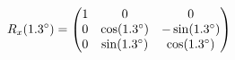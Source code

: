 \documentclass[preview]{standalone}
\begin{document}
\begin{align*}
\special{dvisvgm:raw <g id='unique000'>}R_x(1.3^\circ) = \begin{pmatrix} 1 & 0 & 0 \\ 0 & \cos(1.3^\circ) & -\sin(1.3^\circ) \\ 0 & \sin(1.3^\circ) & \cos(1.3^\circ) \end{pmatrix}\special{dvisvgm:raw </g>}
\end{align*}
\end{document}

